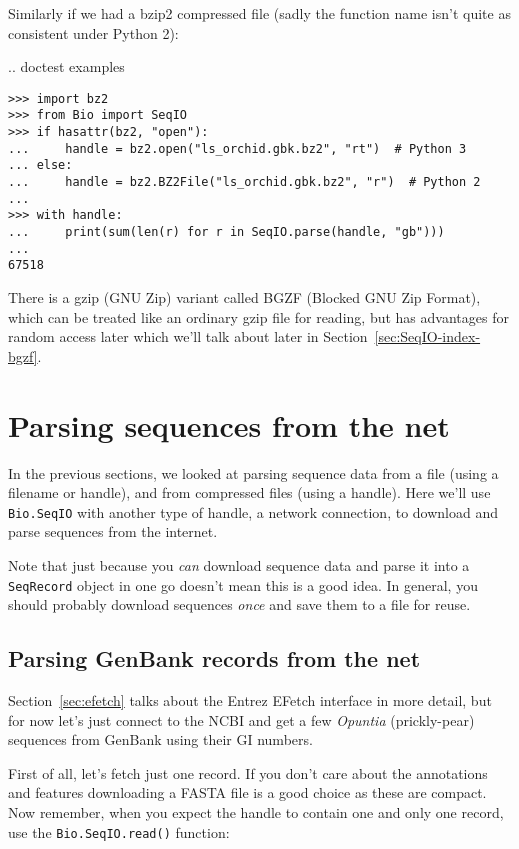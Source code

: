 Similarly if we had a bzip2 compressed file (sadly the function name isn't
quite as consistent under Python 2):


\pandocignoreme .. doctest examples
\begin{verbatim}
>>> import bz2
>>> from Bio import SeqIO
>>> if hasattr(bz2, "open"):
...     handle = bz2.open("ls_orchid.gbk.bz2", "rt")  # Python 3
... else:
...     handle = bz2.BZ2File("ls_orchid.gbk.bz2", "r")  # Python 2
...
>>> with handle:
...     print(sum(len(r) for r in SeqIO.parse(handle, "gb")))
...
67518
\end{verbatim}

There is a gzip (GNU Zip) variant called BGZF (Blocked GNU Zip Format),
which can be treated like an ordinary gzip file for reading, but has
advantages for random access later which we'll talk about later in
Section~\ref{sec:SeqIO-index-bgzf}.

\section{Parsing sequences from the net}
\label{sec:SeqIO_Online}
In the previous sections, we looked at parsing sequence data from a file
(using a filename or handle), and from compressed files (using a handle).
Here we'll use \verb|Bio.SeqIO| with another type of handle, a network
connection, to download and parse sequences from the internet.

Note that just because you \emph{can} download sequence data and parse it into
a \verb|SeqRecord| object in one go doesn't mean this is a good idea.
In general, you should probably download sequences \emph{once} and save them to
a file for reuse.

\subsection{Parsing GenBank records from the net}
\label{sec:SeqIO_GenBank_Online}
Section~\ref{sec:efetch} talks about the Entrez EFetch interface in more detail,
but for now let's just connect to the NCBI and get a few \textit{Opuntia} (prickly-pear)
sequences from GenBank using their GI numbers.

First of all, let's fetch just one record.  If you don't care about the
annotations and features downloading a FASTA file is a good choice as these
are compact.  Now remember, when you expect the handle to contain one and
only one record, use the \verb|Bio.SeqIO.read()| function:

